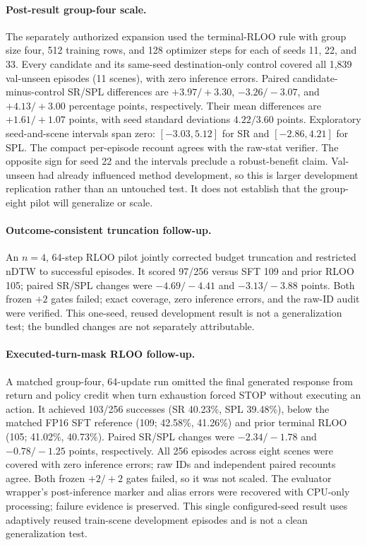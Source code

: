 \documentclass[10pt,twocolumn,letterpaper]{article}
\begin{document}
\paragraph{Post-result group-four scale.} The separately authorized
expansion used the terminal-RLOO rule with group size four, 512 training
rows, and 128 optimizer steps for each of seeds 11, 22, and 33. Every
candidate and its same-seed destination-only control covered all 1,839
val-unseen episodes (11 scenes), with zero inference errors. Paired
candidate-minus-control SR/SPL differences are $+3.97/+3.30$,
$-3.26/-3.07$, and $+4.13/+3.00$ percentage points, respectively.
Their mean differences are $+1.61/+1.07$ points, with seed standard
deviations $4.22/3.60$ points. Exploratory seed-and-scene intervals
span zero: $[-3.03,5.12]$ for SR and $[-2.86,4.21]$ for SPL. The
compact per-episode recount agrees with the raw-stat verifier. The
opposite sign for seed 22 and the intervals preclude a robust-benefit
claim. Val-unseen had already influenced method development, so this
is larger development replication rather than an untouched test. It
does not establish that the group-eight pilot will generalize or scale.

\paragraph{Outcome-consistent truncation follow-up.} An $n=4$, 64-step RLOO
pilot jointly corrected budget truncation and restricted nDTW to successful
episodes. It scored 97/256 versus SFT 109 and prior RLOO 105; paired SR/SPL
changes were $-4.69/-4.41$ and $-3.13/-3.88$ points. Both frozen $+2$ gates
failed; exact coverage, zero inference errors, and the raw-ID audit were
verified. This one-seed, reused development result is not a generalization
test; the bundled changes are not separately attributable.

\paragraph{Executed-turn-mask RLOO follow-up.} A matched group-four,
64-update run omitted the final generated response from return and policy
credit when turn exhaustion forced STOP without executing an action. It
achieved 103/256 successes (SR 40.23\%, SPL 39.48\%), below the matched
FP16 SFT reference (109; 42.58\%, 41.26\%) and prior terminal RLOO
(105; 41.02\%, 40.73\%). Paired SR/SPL changes were $-2.34/-1.78$ and
$-0.78/-1.25$ points, respectively. All 256 episodes across eight scenes
were covered with zero inference errors; raw IDs and independent paired
recounts agree. Both frozen $+2/+2$ gates failed, so it was not scaled.
The evaluator wrapper's post-inference marker and alias errors were
recovered with CPU-only processing; failure evidence is preserved. This
single configured-seed result uses adaptively reused train-scene development
episodes and is not a clean generalization test.
\end{document}
